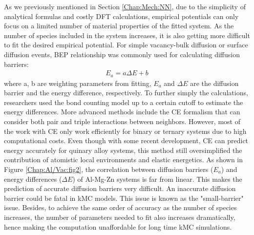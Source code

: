 As we previously mentioned in Section \ref{Chap:Mech:NN}, due to the simplicity of analytical formulas and costly \ac{DFT} calculations, empirical potentials can only focus on a limited number of material properties of the fitted system. As the number of species included in the system increases, it is also getting more difficult to fit the desired empirical potential. For simple vacancy-bulk diffusion or surface diffusion events, \acf{BEP} relationship \cite{bronsted1924katalytische, evans1936further, bell1936theory} was commonly used for calculating diffusion barriers:
\begin{subequations}
\begin{align}
E_a = a \Delta E + b
\label{Chap:Al/Vac:eq:BEP}
\end{align}
\end{subequations}
where a, b are weighting parameters from fitting, $E_a$ and $\Delta E$ are the diffusion barrier and the energy difference, respectively. To further simply the calculations, researchers used the bond counting model up to a certain cutoff to estimate the energy differences. \cite{soisson1996monte, soisson2010atomistic} More advanced methods include the \acf{CE} formalism that can consider both pair and triple interactions between neighbors. \cite{sanchez1984generalized,zunger1994statics,van2001first,persson2010lj,natarajan2016early} However, most of the work with \ac{CE} only work efficiently for binary or ternary systems due to high computational costs. \cite{wu2016cluster} Even though with some recent development\cite{nguyen2017cluster}, \ac{CE} can predict energy accurately for quinary alloy systems, this method still oversimplified the contribution of atomistic local environments and elastic energetics. As shown in Figure \ref{Chap:Al/Vac:fig2}, the correlation between diffusion barriers ($E_a$) and energy differences ($\Delta E$) of Al-Mg-Zn systems is far from linear. This makes the prediction of accurate diffusion barriers very difficult. An inaccurate diffusion barrier could be fatal in \ac{kMC} models. This issue is known as the "small-barrier" issue. \cite{miron2004multiple} Besides, to achieve the same order of accuracy as the number of species increases, the number of parameters needed to fit also increases dramatically\cite{castin2008use}, hence making the computation unaffordable for long time \ac{kMC} simulations.


